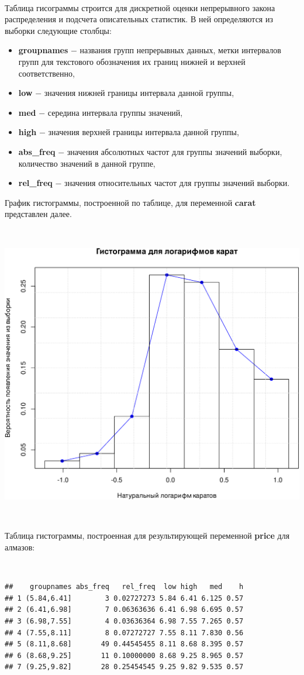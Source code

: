 \documentclass[
]{article}
\begin{document}
\(\ \)

Таблица гисограммы строится для дискретной оценки непрерывного закона
распределения и подсчета описательных статистик. В ней определяются из
выборки следующие столбцы:

\begin{itemize}
\item
  \textbf{groupnames} \(-\) названия групп непрерывных данных, метки
  интервалов групп для текстового обозначения их границ нижней и верхней
  соответственно,
\item
  \textbf{low} \(-\) значения нижней границы интервала данной группы,
\item
  \textbf{med} \(-\) середина интервала группы значений,
\item
  \textbf{high} \(-\) значения верхней границы интервала данной группы,
\item
  \textbf{abs\_freq} \(-\) значения абсолютных частот для группы
  значений выборки, количество значений в данной группе,
\item
  \textbf{rel\_freq} \(-\) значения относительных частот для группы
  значений выборки.
\end{itemize}

График гистограммы, построенной по таблице, для переменной
\textbf{carat} представлен далее.

\(\ \)

\begin{center}\includegraphics[width=0.6\linewidth]{Prac5_files/figure-latex/unnamed-chunk-6-1} \end{center}

\(\ \)

Таблица гистограммы, построенная для результирующей переменной
\textbf{price} для алмазов:

\(\ \)

\begin{verbatim}
##    groupnames abs_freq   rel_freq  low high   med    h
## 1 (5.84,6.41]        3 0.02727273 5.84 6.41 6.125 0.57
## 2 (6.41,6.98]        7 0.06363636 6.41 6.98 6.695 0.57
## 3 (6.98,7.55]        4 0.03636364 6.98 7.55 7.265 0.57
## 4 (7.55,8.11]        8 0.07272727 7.55 8.11 7.830 0.56
## 5 (8.11,8.68]       49 0.44545455 8.11 8.68 8.395 0.57
## 6 (8.68,9.25]       11 0.10000000 8.68 9.25 8.965 0.57
## 7 (9.25,9.82]       28 0.25454545 9.25 9.82 9.535 0.57
\end{verbatim}
\end{document}
